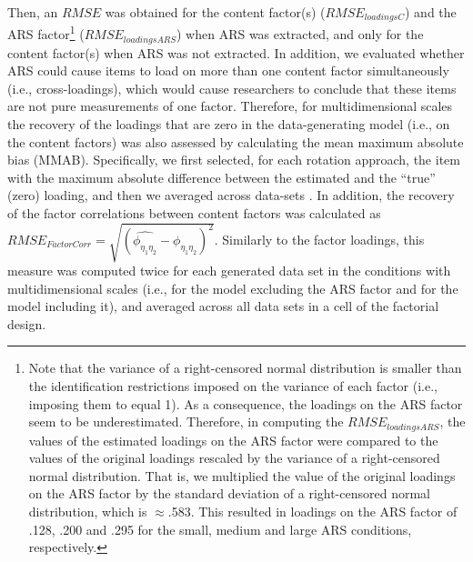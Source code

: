 \documentclass[a4paper,man,natbib]{apa6}
\begin{document}
\begin{linenumbers}
Then, an $RMSE$ was obtained for the content factor(s) ($RMSE_{loadingsC}$) and the ARS factor\footnote{Note that the variance of a right-censored normal distribution is smaller than the identification restrictions imposed on the variance of each factor (i.e., imposing them to equal 1). As a consequence, the loadings on the ARS factor seem to be underestimated. Therefore, in computing the $RMSE_{loadingsARS}$, the values of the estimated loadings on the ARS factor were compared to the values of the original loadings rescaled by the variance of a right-censored normal distribution. That is, we multiplied the value of the original loadings on the ARS factor by the standard deviation of a right-censored normal distribution, which is $\approx$.583. This resulted in loadings on the ARS factor of .128, .200 and .295 for the small, medium and large ARS conditions, respectively.} ($RMSE_{loadingsARS}$) when ARS was extracted, and only for the content factor(s) when ARS was not extracted. In addition, we evaluated whether ARS could cause items to load on more than one content factor simultaneously (i.e., cross-loadings), which would cause researchers to conclude that these items are not pure measurements of one factor. Therefore, for multidimensional scales the recovery of the loadings that are zero in the data-generating model (i.e., on the content factors) was also assessed by calculating the mean maximum absolute bias (MMAB). Specifically, we first selected, for each rotation approach, the item with the maximum absolute difference between the estimated and the \textquotedblleft true\textquotedblright \, (zero) loading, and then we averaged across data-sets%
. In addition, the recovery of the factor correlations between content factors was calculated as $RMSE_{FactorCorr} = \sqrt{(\hat{\phi_{\eta_{1}\eta_{2}}}-\phi_{\eta_{1}\eta_{2}})^2}$. Similarly to the factor loadings, this measure was computed twice for each generated data set in the conditions with multidimensional scales (i.e., for the model excluding the ARS factor and for the model including it), and averaged across all data sets in a cell of the factorial design. 

\end{linenumbers}
\end{document}
